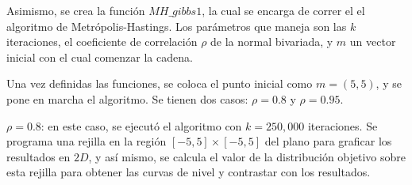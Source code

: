 \documentclass[letterpaper]{article}
\newcommand{\1}{\mathds{1}}
\theoremstyle{definition}
\theoremstyle{definition}
\theoremstyle{definition}
\theoremstyle{definition}
\theoremstyle{definition}
\begin{document}
\begin{itemize}
    Asimismo, se crea la función $MH\_gibbs1$, la cual se encarga de correr el el algoritmo de
    Metrópolis-Hastings. Los parámetros que maneja son las $k$ iteraciones, 
    el coeficiente de correlación $\rho$ de la normal bivariada, y $m$ un vector 
    inicial con el cual comenzar la cadena. 
    \newline

    Una vez definidas las funciones, se coloca el punto inicial como $m=(5,5)$, y se 
    pone en marcha el algoritmo. Se tienen dos casos: $\rho=0.8$ y $\rho=0.95$. 
    \newline

    \textbf{$\rho=0.8$}: en este caso, se ejecutó el algoritmo con $k=250,000$ iteraciones.
    Se programa una rejilla en la región $[-5,5]\times[-5,5]$ del plano para graficar los resultados en $2D$, y así mismo, 
    se calcula el valor de la distribución objetivo sobre esta rejilla para obtener las curvas 
    de nivel y contrastar con los resultados. 
    \newline


\end{itemize}
\end{document}
